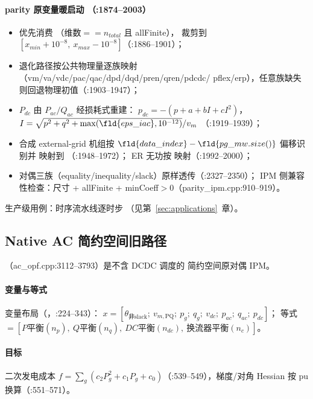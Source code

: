\paragraph{parity 原变量暖启动 （:1874--2003）}
\begin{itemize}
  \item 优先消费 （维数$==n_{total}$ 且 allFinite），
        裁剪到 $[x_{min}+10^{-8},\ x_{max}-10^{-8}]$（:1886--1901）；
  \item 退化路径按公共物理量逐族映射（vm/va/vdc/pac/qac/dpd/dqd/pren/qren/pdcdc/
        pflex/erp），任意族缺失则回退物理初值（:1903--1947）；
  \item $P_{dc}$ 由 $P_{ac}/Q_{ac}$ 经损耗式重建：
        $p_{dc}=-(p+a+bI+cI^2)$，$I=\sqrt{p^2+q^2+\max(\fld{eps\_iac},10^{-12})}/v_m$
        （:1919--1939）；
  \item 合成 external-grid 机组按 $\fld{data\_index}-\fld{pg\_mw.size()}$ 偏移识别并
        映射到 （:1948--1972）；
        ER 无功按  映射（:1992--2000）；
  \item 对偶三族（equality/inequality/slack）原样透传（:2327--2350）；
        IPM 侧兼容性检查：尺寸 + allFinite + minCoeff$>$0（parity\_ipm.cpp:910--919）。
\end{itemize}
生产级用例：时序流水线逐时步 （见第~\ref{sec:applications}~章）。

\subsection{Native AC 简约空间旧路径}
（ac\_opf.cpp:3112--3793）是不含 DCDC 调度的
简约空间原对偶 IPM。

\paragraph{变量与等式}
变量布局（，:224--343）：
$x=[\theta_{\text{非slack}};\ v_{m,\text{PQ}};\ p_g;\ q_g;\ v_{dc};\ p_{ac};\ q_{ac};\ p_{dc}]$；
等式 $=[P\text{平衡}(n_p),\ Q\text{平衡}(n_q),\ DC\text{平衡}(n_{dc}),\ \text{换流器平衡}(n_c)]$。

\paragraph{目标}
二次发电成本 $f=\sum_g(c_2P_g^2+c_1P_g+c_0)$（:539--549），梯度/对角 Hessian 按 pu 换算（:551--571）。

